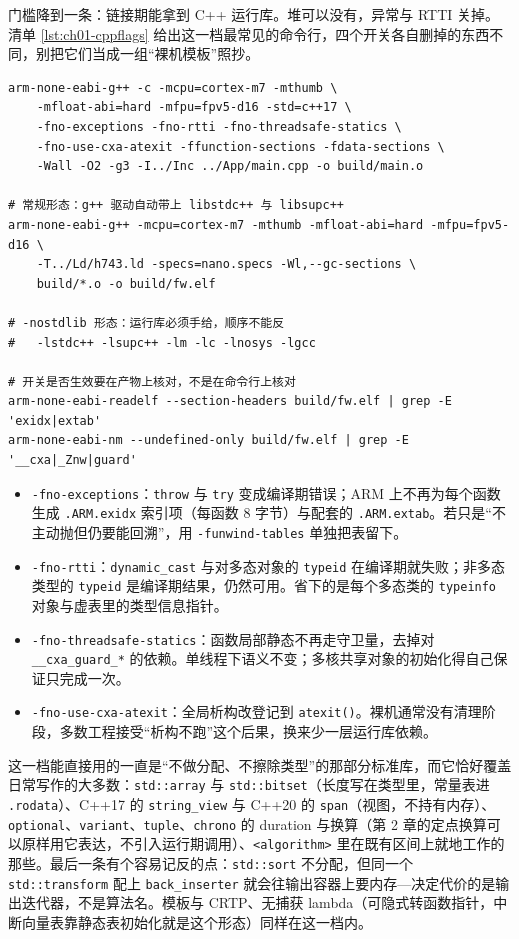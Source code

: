 \documentclass[12pt,a4paper,fontset=fandol]{ctexbook}
\newcommand{\cpp}[1]{C++#1}
\newcommand{\Fn}[1]{\texttt{#1()}}
\newcommand{\Tp}[1]{\texttt{#1}}
\newcommand{\Bk}{\discretionary{}{}{}}
\newcommand{\Lang}[1]{\textsf{#1}}
\newcommand{\CPP}{\Lang{C++}}
\begin{document}
门槛降到一条：链接期能拿到 \CPP{} 运行库。堆可以没有，异常与 RTTI 关掉。清单 \ref{lst:ch01-cppflags} 给出这一档最常见的命令行，四个开关各自删掉的东西不同，别把它们当成一组``裸机模板''照抄。

\begin{lstlisting}[style=shellstyle,caption={裸机 \CPP{} 子集：编译开关、链接形态与产物核对},label={lst:ch01-cppflags}]
arm-none-eabi-g++ -c -mcpu=cortex-m7 -mthumb \
    -mfloat-abi=hard -mfpu=fpv5-d16 -std=c++17 \
    -fno-exceptions -fno-rtti -fno-threadsafe-statics \
    -fno-use-cxa-atexit -ffunction-sections -fdata-sections \
    -Wall -O2 -g3 -I../Inc ../App/main.cpp -o build/main.o

# 常规形态：g++ 驱动自动带上 libstdc++ 与 libsupc++
arm-none-eabi-g++ -mcpu=cortex-m7 -mthumb -mfloat-abi=hard -mfpu=fpv5-d16 \
    -T../Ld/h743.ld -specs=nano.specs -Wl,--gc-sections \
    build/*.o -o build/fw.elf

# -nostdlib 形态：运行库必须手给，顺序不能反
#   -lstdc++ -lsupc++ -lm -lc -lnosys -lgcc

# 开关是否生效要在产物上核对，不是在命令行上核对
arm-none-eabi-readelf --section-headers build/fw.elf | grep -E 'exidx|extab'
arm-none-eabi-nm --undefined-only build/fw.elf | grep -E '__cxa|_Znw|guard'
\end{lstlisting}

\begin{itemize}
\item \Tp{-fno-exceptions}：\Tp{throw} 与 \Tp{try} 变成编译期错误；ARM 上不再为每个函数生成 \Tp{.ARM.exidx} 索引项（每函数 8 字节）与配套的 \Tp{.ARM.extab}。若只是``不主动抛但仍要能回溯''，用 \Tp{-funwind-tables} 单独把表留下。
\item \Tp{-fno-rtti}：\Tp{dynamic\_cast} 与对多态对象的 \Tp{typeid} 在编译期就失败；非多态类型的 \Tp{typeid} 是编译期结果，仍然可用。省下的是每个多态类的 \Tp{typeinfo} 对象与虚表里的类型信息指针。
\item \Tp{-fno-{\Bk}threadsafe-{\Bk}statics}：函数局部静态不再走守卫量，去掉对 \Tp{\_\_cxa{\Bk}\_guard\_*} 的依赖。单线程下语义不变；多核共享对象的初始化得自己保证只完成一次。
\item \Tp{-fno-use-cxa-atexit}：全局析构改登记到 \Fn{atexit}。裸机通常没有清理阶段，多数工程接受``析构不跑''这个后果，换来少一层运行库依赖。
\end{itemize}

这一档能直接用的一直是``不做分配、不擦除类型''的那部分标准库，而它恰好覆盖日常写作的大多数：\Tp{std::array} 与 \Tp{std::bitset}（长度写在类型里，常量表进 \Tp{.rodata}）、\cpp{17} 的 \Tp{string\_view} 与 \cpp{20} 的 \Tp{span}（视图，不持有内存）、\Tp{optional}、\Tp{variant}、\Tp{tuple}、\Tp{chrono} 的 duration 与换算（第 2 章的定点换算可以原样用它表达，不引入运行期调用）、\Tp{<algorithm>} 里在既有区间上就地工作的那些。最后一条有个容易记反的点：\Tp{std::sort} 不分配，但同一个 \Tp{std::transform} 配上 \Tp{back\_inserter} 就会往输出容器上要内存---决定代价的是输出迭代器，不是算法名。模板与 CRTP、无捕获 lambda（可隐式转函数指针，中断向量表靠静态表初始化就是这个形态）同样在这一档内。
\end{document}
